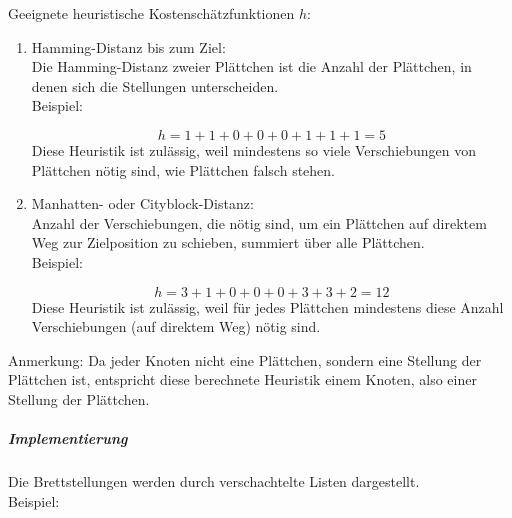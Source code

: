 Geeignete heuristische Kostenschätzfunktionen $h$:
\begin{enumerate}
\item Hamming-Distanz bis zum Ziel:\\
Die Hamming-Distanz zweier Plättchen ist die Anzahl der Plättchen, in denen sich die Stellungen unterscheiden.\\
Beispiel:
\begin{center}
\end{center}
$$h=1+1+0+0+0+1+1+1=5$$
Diese Heuristik ist zulässig, weil mindestens so viele Verschiebungen von Plättchen nötig sind, wie Plättchen falsch stehen.
\item Manhatten- oder Cityblock-Distanz:\\
Anzahl der Verschiebungen, die nötig sind, um ein Plättchen auf direktem Weg zur Zielposition zu schieben, summiert über alle Plättchen.\\
Beispiel:
\begin{center}
\end{center}
$$h=3+1+0+0+0+3+3+2=12$$
Diese Heuristik ist zulässig, weil für jedes Plättchen mindestens diese Anzahl Verschiebungen (auf direktem Weg) nötig sind.
\end{enumerate}
Anmerkung: Da jeder Knoten nicht eine Plättchen, sondern eine Stellung der Plättchen ist, entspricht diese berechnete Heuristik einem Knoten, also einer Stellung der Plättchen.
\subparagraph{Implementierung} Die Brettstellungen werden durch verschachtelte Listen dargestellt.\\
Beispiel:
\begin{center}
\end{center}
